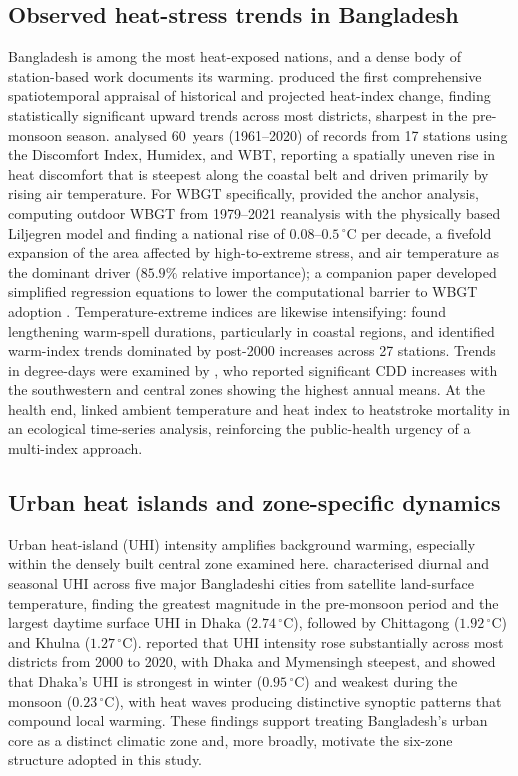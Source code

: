 \documentclass[review,11pt]{elsarticle}
\newcommand{\degC}{\ensuremath{^{\circ}\mathrm{C}}}
\begin{document}
\subsection{Observed heat-stress trends in Bangladesh}
Bangladesh is among the most heat-exposed nations, and a dense body of
station-based work documents its warming. \citet{rahman2021} produced the first
comprehensive spatiotemporal appraisal of historical and projected heat-index
change, finding statistically significant upward trends across most districts,
sharpest in the pre-monsoon season. \citet{tanim2024heat} analysed 60~years
(1961--2020) of records from 17 stations using the Discomfort Index, Humidex, and
WBT, reporting a spatially uneven rise in heat discomfort that is steepest along
the coastal belt and driven primarily by rising air temperature. For WBGT
specifically, \citet{kamal2024scientific} provided the anchor analysis, computing
outdoor WBGT from 1979--2021 reanalysis with the physically based Liljegren model
and finding a national rise of $0.08$--$0.5\,\degC$ per decade, a fivefold
expansion of the area affected by high-to-extreme stress, and air temperature as
the dominant driver ($85.9\%$ relative importance); a companion paper developed
simplified regression equations to lower the computational barrier to WBGT
adoption \citep{kamal2024ijc}. Temperature-extreme indices are likewise
intensifying: \citet{ahmed2022} found lengthening warm-spell durations,
particularly in coastal regions, and \citet{islam2021extremes} identified
warm-index trends dominated by post-2000 increases across 27 stations. Trends in
degree-days were examined by \citet{islam2020cdd}, who reported significant CDD
increases with the southwestern and central zones showing the highest annual
means. At the health end, \citet{miah2026} linked ambient temperature and heat
index to heatstroke mortality in an ecological time-series analysis, reinforcing
the public-health urgency of a multi-index approach.

\subsection{Urban heat islands and zone-specific dynamics}
Urban heat-island (UHI) intensity amplifies background warming, especially within
the densely built central zone examined here. \citet{dewan2021} characterised
diurnal and seasonal UHI across five major Bangladeshi cities from satellite
land-surface temperature, finding the greatest magnitude in the pre-monsoon period
and the largest daytime surface UHI in Dhaka ($2.74\,\degC$), followed by
Chittagong ($1.92\,\degC$) and Khulna ($1.27\,\degC$). \citet{faisal2022} reported
that UHI intensity rose substantially across most districts from 2000 to 2020,
with Dhaka and Mymensingh steepest, and \citet{park2024} showed that Dhaka's UHI
is strongest in winter ($0.95\,\degC$) and weakest during the monsoon
($0.23\,\degC$), with heat waves producing distinctive synoptic patterns that
compound local warming. These findings support treating Bangladesh's urban core as
a distinct climatic zone and, more broadly, motivate the six-zone structure adopted
in this study.
\end{document}
